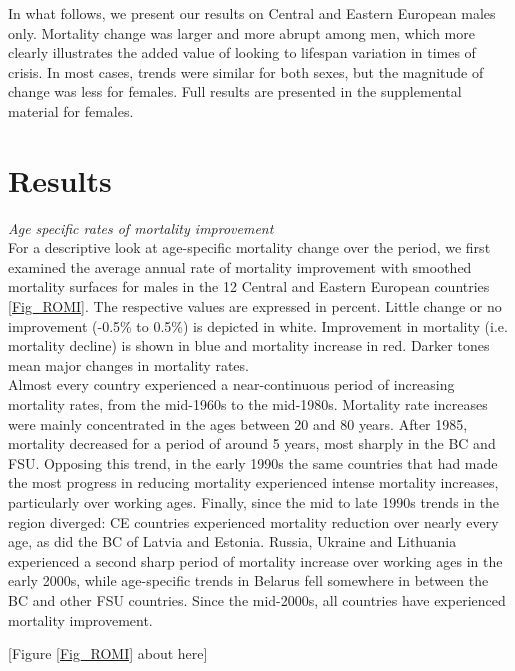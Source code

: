 \documentclass{article}
\begin{document}
\begin{spacing}{1.5}
In what follows, we present our results on Central and Eastern European males only. Mortality change was larger and more abrupt among men, which more clearly illustrates the added value of looking to lifespan variation in times of crisis. In most cases, trends were similar for both sexes, but the magnitude of change was less for females. Full results are presented in the supplemental material for females.\\



\section*{Results}
\emph{Age specific rates of mortality improvement}\\

For a descriptive look at age-specific mortality change over the period, we first examined the average annual rate of mortality improvement \citep{Rau2013} with smoothed mortality surfaces \citep{Camarda2012} for males in the 12 Central and Eastern European countries \ref{Fig_ROMI}. The respective values are expressed in percent. Little change or no improvement (-0.5\% to 0.5\%) is depicted in white. Improvement in mortality (i.e. mortality decline) is shown in blue and mortality increase in red. Darker tones mean major changes in mortality rates.\\

Almost every country experienced a near-continuous period of increasing mortality rates, from the mid-1960s to the mid-1980s. Mortality rate increases were mainly concentrated in the ages between 20 and 80 years. After 1985, mortality decreased for a period of around 5 years, most sharply in the BC and FSU. Opposing this trend, in the early 1990s the same countries that had made the most progress in reducing mortality experienced intense mortality increases, particularly over working ages. Finally, since the mid to late 1990s trends in the region diverged: CE countries experienced mortality reduction over nearly every age, as did the BC of Latvia and Estonia. Russia, Ukraine and Lithuania experienced a second sharp period of mortality increase over working ages in the early 2000s, while age-specific trends in Belarus fell somewhere in between the BC and other FSU countries. Since the mid-2000s, all countries have experienced mortality improvement.\\



\begin{center}
[Figure \ref{Fig_ROMI} about here]
\end{center}


\end{spacing}
\end{document}
